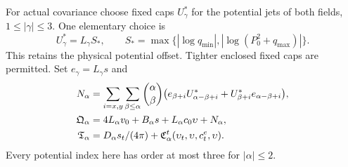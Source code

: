 For actual covariance choose fixed caps $U_\gamma^*$ for the potential
jets of both fields, $1\le|\gamma|\le3$. One elementary choice is
\begin{equation}
 U_\gamma^*=L_\gamma S_*,\qquad
 S_* =\max\{|\log q_{\min}|,|\log(P_0^2+q_{\max})|\}.
 \label{eq:cj-potential-caps}
\end{equation}
This retains the physical potential offset. Tighter enclosed fixed caps
are permitted. Set $e_\gamma=L_\gamma s$ and
\begin{align}
 N_\alpha&=\sum_{i=x,y}\sum_{\beta\le\alpha}\binom{\alpha}{\beta}
 \bigl(e_{\beta+i}U^*_{\alpha-\beta+i}
       +U^*_{\beta+i}e_{\alpha-\beta+i}\bigr),\notag\\
 \mathfrak Q_\alpha&=4L_\alpha v_0+B_\alpha s+L_\alpha c_0\upsilon+N_\alpha,\notag\\
 \mathfrak T_\alpha&=D_\alpha s_t/(4\pi)
       +\mathfrak C^t_\alpha(\upsilon_t,\upsilon,c_t^e,\upsilon).
 \label{eq:cj-covariance-map}
\end{align}
Every potential index here has order at most three for $|\alpha|\le2$.

